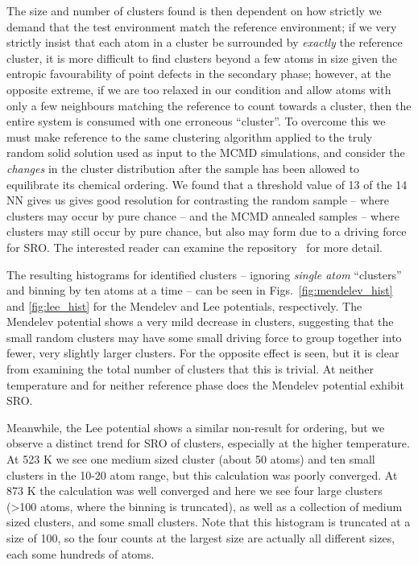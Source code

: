 The size and number of clusters found is then dependent on how strictly we demand that the test environment match the reference environment;
if we very strictly insist that each atom in a cluster be surrounded by \emph{exactly} the reference cluster, it is more difficult to find clusters beyond a few atoms in size given the entropic favourability of point defects in the secondary phase;
however, at the opposite extreme, if we are too relaxed in our condition and allow atoms with only a few neighbours matching the reference to count towards a cluster, then the entire system is consumed with one erroneous ``cluster''.
To overcome this we must make reference to the same clustering algorithm applied to the truly random solid solution used as input to the MCMD simulations, and consider the \emph{changes} in the cluster distribution after the sample has been allowed to equilibrate its chemical ordering.
We found that a threshold value of 13 of the 14 NN gives us gives good resolution for contrasting the random sample -- where clusters may occur by pure chance -- and the MCMD annealed samples -- where clusters may still occur by pure chance, but also may form due to a driving force for SRO.
The interested reader can examine the  repository~\cite{feal} for more detail.

The resulting histograms for identified clusters -- ignoring \emph{single atom} ``clusters'' and binning by ten atoms at a time -- can be seen in Figs.~\ref{fig:mendelev_hist} and \ref{fig:lee_hist} for the Mendelev and Lee potentials, respectively.
The Mendelev potential shows a very mild decrease in \DOTHREE clusters, suggesting that the small random clusters may have some small driving force to group together into fewer, very slightly larger clusters.
For \BTWO the opposite effect is seen, but it is clear from examining the total number of clusters that this is trivial.
At neither temperature and for neither reference phase does the Mendelev potential exhibit SRO.

Meanwhile, the Lee potential shows a similar non-result for \BTWO ordering, but we observe a distinct trend for SRO of \DOTHREE clusters, especially at the higher temperature.
At 523 K we see one medium sized cluster (about 50 atoms) and ten small clusters in the 10-20 atom range,
but this calculation was poorly converged.
At 873 K the calculation was well converged and here we see four large clusters (>100 atoms, where the binning is truncated), as well as a collection of medium sized clusters, and some small clusters.
Note that this histogram is truncated at a size of 100, so the four counts at the largest size are actually all different sizes, each some hundreds of atoms.

